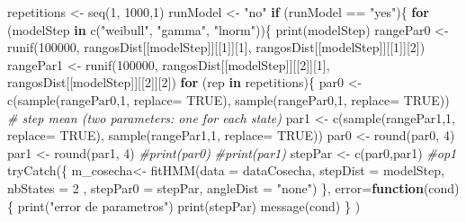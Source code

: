 \documentclass[
]{article}
\newenvironment{Shaded}{\begin{snugshade}}{\end{snugshade}}
\newcommand{\AttributeTok}[1]{\textcolor[rgb]{0.77,0.63,0.00}{#1}}
\newcommand{\CommentTok}[1]{\textcolor[rgb]{0.56,0.35,0.01}{\textit{#1}}}
\newcommand{\ConstantTok}[1]{\textcolor[rgb]{0.00,0.00,0.00}{#1}}
\newcommand{\ControlFlowTok}[1]{\textcolor[rgb]{0.13,0.29,0.53}{\textbf{#1}}}
\newcommand{\DecValTok}[1]{\textcolor[rgb]{0.00,0.00,0.81}{#1}}
\newcommand{\FunctionTok}[1]{\textcolor[rgb]{0.00,0.00,0.00}{#1}}
\newcommand{\NormalTok}[1]{#1}
\newcommand{\OtherTok}[1]{\textcolor[rgb]{0.56,0.35,0.01}{#1}}
\newcommand{\SpecialCharTok}[1]{\textcolor[rgb]{0.00,0.00,0.00}{#1}}
\newcommand{\StringTok}[1]{\textcolor[rgb]{0.31,0.60,0.02}{#1}}
\begin{document}
\begin{Shaded}
\begin{Highlighting}[]
\NormalTok{repetitions }\OtherTok{\textless{}{-}} \FunctionTok{seq}\NormalTok{(}\DecValTok{1}\NormalTok{, }\DecValTok{1000}\NormalTok{,}\DecValTok{1}\NormalTok{)}
\NormalTok{runModel }\OtherTok{\textless{}{-}} \StringTok{"no"}
\ControlFlowTok{if}\NormalTok{ (runModel }\SpecialCharTok{==} \StringTok{"yes"}\NormalTok{)\{}
\ControlFlowTok{for}\NormalTok{ (modelStep }\ControlFlowTok{in} \FunctionTok{c}\NormalTok{(}\StringTok{"weibull"}\NormalTok{, }\StringTok{"gamma"}\NormalTok{, }\StringTok{"lnorm"}\NormalTok{))\{}
  \FunctionTok{print}\NormalTok{(modelStep)}
\NormalTok{  rangePar0 }\OtherTok{\textless{}{-}} \FunctionTok{runif}\NormalTok{(}\DecValTok{100000}\NormalTok{, rangosDist[[modelStep]][[}\DecValTok{1}\NormalTok{]][}\DecValTok{1}\NormalTok{], rangosDist[[modelStep]][[}\DecValTok{1}\NormalTok{]][}\DecValTok{2}\NormalTok{])}
\NormalTok{  rangePar1 }\OtherTok{\textless{}{-}} \FunctionTok{runif}\NormalTok{(}\DecValTok{100000}\NormalTok{, rangosDist[[modelStep]][[}\DecValTok{2}\NormalTok{]][}\DecValTok{1}\NormalTok{], rangosDist[[modelStep]][[}\DecValTok{2}\NormalTok{]][}\DecValTok{2}\NormalTok{])}
  \ControlFlowTok{for}\NormalTok{ (rep }\ControlFlowTok{in}\NormalTok{ repetitions)\{}
\NormalTok{    par0 }\OtherTok{\textless{}{-}} \FunctionTok{c}\NormalTok{(}\FunctionTok{sample}\NormalTok{(rangePar0,}\DecValTok{1}\NormalTok{, }\AttributeTok{replace=} \ConstantTok{TRUE}\NormalTok{),}
              \FunctionTok{sample}\NormalTok{(rangePar0,}\DecValTok{1}\NormalTok{, }\AttributeTok{replace=} \ConstantTok{TRUE}\NormalTok{)) }\CommentTok{\# step mean (two parameters: one for each state)}
\NormalTok{    par1 }\OtherTok{\textless{}{-}} \FunctionTok{c}\NormalTok{(}\FunctionTok{sample}\NormalTok{(rangePar1,}\DecValTok{1}\NormalTok{, }\AttributeTok{replace=} \ConstantTok{TRUE}\NormalTok{), }
              \FunctionTok{sample}\NormalTok{(rangePar1,}\DecValTok{1}\NormalTok{, }\AttributeTok{replace=} \ConstantTok{TRUE}\NormalTok{)) }
\NormalTok{    par0 }\OtherTok{\textless{}{-}} \FunctionTok{round}\NormalTok{(par0, }\DecValTok{4}\NormalTok{)}
\NormalTok{    par1 }\OtherTok{\textless{}{-}} \FunctionTok{round}\NormalTok{(par1, }\DecValTok{4}\NormalTok{)}
    \CommentTok{\#print(par0)}
    \CommentTok{\#print(par1)}
\NormalTok{    stepPar }\OtherTok{\textless{}{-}} \FunctionTok{c}\NormalTok{(par0,par1)}
  \CommentTok{\#op1}
    \FunctionTok{tryCatch}\NormalTok{(\{}
\NormalTok{    m\_cosecha}\OtherTok{\textless{}{-}} \FunctionTok{fitHMM}\NormalTok{(}\AttributeTok{data =}\NormalTok{ dataCosecha, }\AttributeTok{stepDist =}\NormalTok{ modelStep,  }
                       \AttributeTok{nbStates =} \DecValTok{2}\NormalTok{ , }\AttributeTok{stepPar0 =}\NormalTok{ stepPar, }\AttributeTok{angleDist =} \StringTok{"none"}\NormalTok{)}
\NormalTok{    \},}
    \AttributeTok{error=}\ControlFlowTok{function}\NormalTok{(cond)\{}
      \FunctionTok{print}\NormalTok{(}\StringTok{"error de parametros"}\NormalTok{)}
      \FunctionTok{print}\NormalTok{(stepPar)}
      \FunctionTok{message}\NormalTok{(cond)}
\NormalTok{    \}}
\NormalTok{    )}
    

\end{Highlighting}
\end{Shaded}
\end{document}
